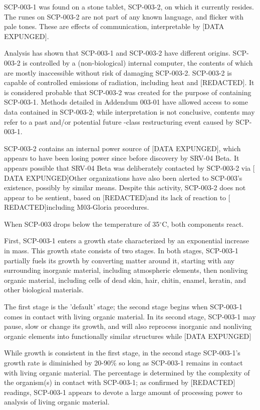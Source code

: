 \documentclass[a4paper, 11pt]{article}
\newcommand{\lb}{\ensuremath{[}}
\newcommand{\rb}{\ensuremath{]}}
\newcommand{\degree}{$^{\circ}$}
\newcommand{\redacted}{\lb REDACTED\rb}
\newcommand{\expunged}{\lb DATA EXPUNGED\rb}
\begin{document}
SCP-003-1 was found on a stone tablet, SCP-003-2, on which it currently resides. The runes on SCP-003-2 are not part of any known language, and flicker with pale tones. These are effects of communication, interpretable by \expunged.

Analysis has shown that SCP-003-1 and SCP-003-2 have different origins. SCP-003-2 is controlled by a (non-biological) internal computer, the contents of which are mostly inaccessible without risk of damaging SCP-003-2. SCP-003-2 is capable of controlled emissions of radiation, including heat and \redacted. It is considered probable that SCP-003-2 was created for the purpose of containing SCP-003-1. Methods detailed in Addendum 003-01 have allowed access to some data contained in SCP-003-2; while interpretation is not conclusive, contents may refer to a past and/or potential future -class restructuring event caused by SCP-003-1.

SCP-003-2 contains an internal power source of \linebreak \expunged, which appears to have been losing power since  before discovery by SRV-04 Beta. It appears possible that SRV-04 Beta was deliberately contacted by SCP-003-2 via \expunged Other organizations have also been alerted to SCP-003's existence, possibly by similar means. Despite this activity, SCP-003-2 does not appear to be sentient, based on \redacted and its lack of reaction to \redacted including M03-Gloria procedures.

When SCP-003 drops below the temperature of 35\degree C, both components react.

First, SCP-003-1 enters a growth state characterized by an exponential increase in mass. This growth state consists of two stages. In both stages, SCP-003-1 partially fuels its growth by converting matter around it, starting with any surrounding inorganic material, including atmospheric elements, then nonliving organic material, including cells of dead skin, hair, chitin, enamel, keratin, and other biological materials.

The first stage is the 'default' stage; the second stage begins when SCP-003-1 comes in contact with living organic material. In its second stage, SCP-003-1 may pause, slow or change its growth, and will also reprocess inorganic and nonliving organic elements into functionally similar structures while \expunged

While growth is consistent in the first stage, in the second stage SCP-003-1's growth rate is diminished by 20-90\% so long as SCP-003-1 remains in contact with living organic material. The percentage is determined by the complexity of the organism(s) in contact with SCP-003-1; as confirmed by \redacted readings, SCP-003-1 appears to devote a large amount of processing power to analysis of living organic material.
\end{document}
